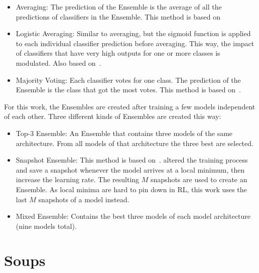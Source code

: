\begin{itemize}
	\item Averaging: The prediction of the Ensemble is the average of all the predictions of classifiers in the Ensemble. This method is based on~\parencite{ismail_fawaz_deep_2019}
	\item Logistic Averaging: Similar to averaging, but the sigmoid function is applied to each individual classifier prediction before averaging. This way, the impact of classifiers that have very high outputs for one or more classes is modulated. Also based on~\parencite{ismail_fawaz_deep_2019}.
	\item Majority Voting: Each classifier votes for one class. The prediction of the Ensemble is the class that got the most votes. This method is based on~\parencite{littlestone_weighted_1994}.
\end{itemize}

For this work, the Ensembles are created after training a few models independent of each other. Three different kinds of Ensembles are created this way:

\begin{itemize}
	\item Top-3 Ensemble: An Ensemble that contains three models of the same architecture. From all models of that architecture the three best are selected.
	\item Snapshot Ensemble: This method is based on~\parencite{huang_snapshot_2017}. \textcite{huang_snapshot_2017} altered the training process and save a snapshot whenever the model arrives at a local minimum, then increase the learning rate. The resulting $M$ snapshots are used to create an Ensemble. As local minima are hard to pin down in RL, this work uses the last $M$ snapshots of a model instead.
	\item Mixed Ensemble: Contains the best three models of each model architecture (nine models total).
\end{itemize}


\section{Soups}

